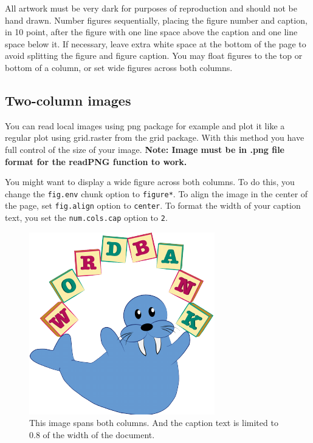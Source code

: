 \documentclass[10pt, letterpaper]{article}
\newenvironment{CodeChunk}{}{}
\begin{document}
All artwork must be very dark for purposes of reproduction and should
not be hand drawn. Number figures sequentially, placing the figure
number and caption, in 10 point, after the figure with one line space
above the caption and one line space below it. If necessary, leave extra
white space at the bottom of the page to avoid splitting the figure and
figure caption. You may float figures to the top or bottom of a column,
or set wide figures across both columns.

\subsection{Two-column images}\label{two-column-images}

You can read local images using png package for example and plot it like
a regular plot using grid.raster from the grid package. With this method
you have full control of the size of your image. \textbf{Note: Image
must be in .png file format for the readPNG function to work.}

You might want to display a wide figure across both columns. To do this,
you change the \texttt{fig.env} chunk option to \texttt{figure*}. To
align the image in the center of the page, set \texttt{fig.align} option
to \texttt{center}. To format the width of your caption text, you set
the \texttt{num.cols.cap} option to \texttt{2}.

\begin{CodeChunk}
\begin{figure}[h]

{\centering \includegraphics{figs/2-col-image-1} 

}

\caption[This image spans both columns]{This image spans both columns. And the caption text is limited to 0.8 of the width of the document.}\label{fig:2-col-image}
\end{figure}
\end{CodeChunk}
\end{document}
